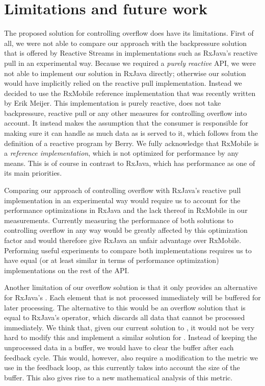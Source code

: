 \section{Limitations and future work}
The proposed solution for controlling overflow does have its limitations. First of all, we were not able to compare our approach with the backpressure solution that is offered by Reactive Streams in implementations such as RxJava's reactive pull in an experimental way. Because we required a \emph{purely reactive} API, we were not able to implement our solution in RxJava directly; otherwise our solution would have implicitly relied on the reactive pull implementation. Instead we decided to use the RxMobile reference implementation that was recently written by Erik Meijer. This implementation is purely reactive, does not take backpressure, reactive pull or any other measures for controlling overflow into account. It instead makes the assumption that the consumer is responsible for making sure it can handle as much data as is served to it, which follows from the definition of a reactive program by Berry. We fully acknowledge that RxMobile is a \emph{reference implementation}, which is not optimized for performance by any means. This is of course in contrast to RxJava, which has performance as one of its main priorities.

Comparing our approach of controlling overflow with RxJava's reactive pull implementation in an experimental way would require us to account for the performance optimizations in RxJava and the lack thereof in RxMobile in our measurements. Currently measuring the performance of both solutions to controlling overflow in any way would be greatly affected by this optimization factor and would therefore give RxJava an unfair advantage over RxMobile. Performing useful experiments to compare both implementations requires us to have equal (or at least similar in terms of performance optimization) implementations on the rest of the API.

Another limitation of our overflow solution is that it only provides an alternative for RxJava's . Each element that is not processed immediately will be buffered for later processing. The alternative to this would be an overflow solution that is equal to RxJava's  operator, which discards all data that cannot be processed immediately. We think that, given our current solution to , it would not be very hard to modify this and implement a similar solution for . Instead of keeping the unprocessed data in a buffer, we would have to clear the buffer after each feedback cycle. This would, however, also require a modification to the metric we use in the feedback loop, as this currently takes into account the size of the buffer. This also gives rise to a new mathematical analysis of this metric.

